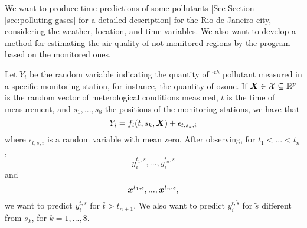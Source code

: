 \BL We want to produce time predictions of some pollutants [See Section
\ref{sec:polluting-gases} for a detailed description] for the Rio de Janeiro
city, considering the weather, location, and time variables. We also want to
develop a method for estimating the air quality of not monitored regions by
the program based on the monitored ones.

Let $Y_i$ be the random
variable indicating the quantity of i$^{th}$ pollutant measured in a specific
monitoring station, for instance, the quantity of ozone. If $\boldsymbol{X} \in \mathcal{X}
\subseteq \mathbb{R}^{p}$ is the random vector of meterological conditions measured,
$t$ is the time of measurement, and $s_1, ..., s_8$ the positions of the
monitoring stations, we have that 
\begin{equation}
    \label{eq:problem definition}
    Y_i = f_i(t, s_k, \boldsymbol{X}) + \epsilon_{t,s_k,i}
\end{equation}
where $\epsilon_{t,s,i}$ is a random variable with mean zero. After
observing, for $t_1 < ... < t_n$,  
$$y_i^{t_1,s}, ..., y_i^{t_n,s}$$ 
and 
$$
\boldsymbol{x}^{t_1,s}, ..., \boldsymbol{x}^{t_n,s},
$$
we want to predict $y_i^{\bar{t},s}$ for $\bar{t} > t_{n+1}$. We also want to
predict $y_i^{t, \tilde{s}}$ for $\tilde{s}$ different from $s_k$, for $k =
1,...,8$. 